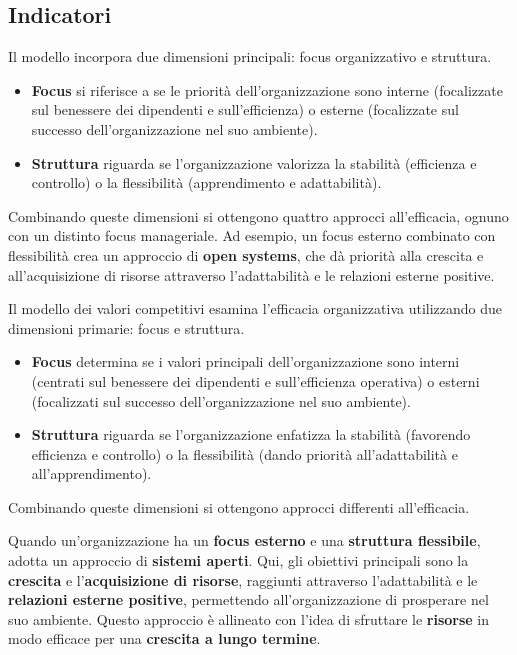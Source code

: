 \documentclass{article}
\begin{document}
\subsection{Indicatori}
Il modello incorpora due dimensioni principali: focus organizzativo e struttura. 
\begin{itemize}
    \item \textbf{Focus} si riferisce a se le priorità dell’organizzazione sono interne (focalizzate sul benessere dei dipendenti e sull’efficienza) o esterne (focalizzate sul successo dell’organizzazione nel suo ambiente).
    \item \textbf{Struttura} riguarda se l’organizzazione valorizza la stabilità (efficienza e controllo) o la flessibilità (apprendimento e adattabilità).
\end{itemize}
Combinando queste dimensioni si ottengono quattro approcci all’efficacia, ognuno con un distinto focus manageriale. Ad esempio, un focus esterno combinato con flessibilità crea un approccio di \textbf{open systems}, che dà priorità alla crescita e all’acquisizione di risorse attraverso l’adattabilità e le relazioni esterne positive.

Il modello dei valori competitivi esamina l’efficacia organizzativa utilizzando due dimensioni primarie: focus e struttura. 
\begin{itemize}
    \item \textbf{Focus} determina se i valori principali dell’organizzazione sono interni (centrati sul benessere dei dipendenti e sull’efficienza operativa) o esterni (focalizzati sul successo dell’organizzazione nel suo ambiente).
    \item \textbf{Struttura} riguarda se l’organizzazione enfatizza la stabilità (favorendo efficienza e controllo) o la flessibilità (dando priorità all’adattabilità e all’apprendimento).
\end{itemize}

Combinando queste dimensioni si ottengono approcci differenti all’efficacia. 

Quando un’organizzazione ha un \textbf{focus esterno} e una \textbf{struttura flessibile}, adotta un approccio di \textbf{sistemi aperti}. Qui, gli obiettivi principali sono la \textbf{crescita} e l'\textbf{acquisizione di risorse}, raggiunti attraverso l’adattabilità e le \textbf{relazioni esterne positive}, permettendo all’organizzazione di prosperare nel suo ambiente. Questo approccio è allineato con l’idea di sfruttare le \textbf{risorse} in modo efficace per una \textbf{crescita a lungo termine}.
\end{document}
